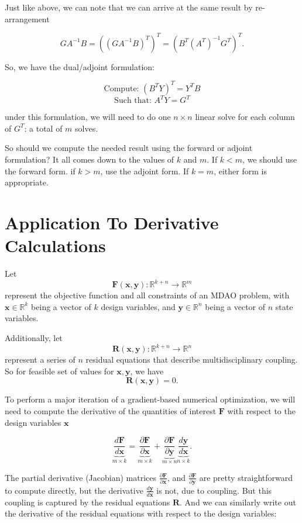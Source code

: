 \documentclass{article}
\begin{document}
Just like above, we can note that we can arrive at the same result by re-arrangement

$$G A^{-1} B = \left(\left( G A^{-1} B\right)^T\right)^T = \left( B^T \left(A^T\right)^{-1} G^T \right)^T.$$

So, we have the dual/adjoint formulation:

$$\text{Compute: } \left(B^T Y\right)^T = Y^T B$$
$$\text{Such that: } A^T Y = G^T$$

under this formulation, we will need to do one $n \times n$ linear solve for each
column of $G^T$: a total of $m$ solves.

So should we compute the needed result using the forward or adjoint formulation?
It all comes down to the values of $k$ and $m$. If $k < m$, we should use the forward form.
if $k > m$, use the adjoint form. If $k = m$, either form is appropriate.

\section{Application To Derivative Calculations}

Let 
$$\mathbf F \left(\mathbf x, \mathbf y \right) : \mathbb{R}^{k + n} \to \mathbb{R}^{m}$$
represent the objective function and all constraints of an MDAO problem,
with $\mathbf x \in \mathbb{R}^{k}$ being a vector of $k$  design variables, and 
$\mathbf y \in \mathbb{R}^{n}$ being a vector of $n$ state variables.

Additionally, let
$$\mathbf R \left(\mathbf x, \mathbf y \right) : \mathbb{R}^{k + n} \to \mathbb{R}^{n}$$
represent a series of $n$ residual equations that describe multidisciplinary coupling.
So for feasible set of values for $\mathbf x, \mathbf y$, we have
$$ \mathbf R \left(\mathbf x, \mathbf y \right)  = 0. $$

To perform a major iteration of a gradient-based numerical optimization, we will need to compute the 
derivative of the quantities of interest $\mathbf F$ with respect to the design variables $\mathbf x$ 

$$ \underbrace {\frac{d \mathbf F}{d \mathbf x}}_{m \times k} = \underbrace {\frac{\partial \mathbf F}{\partial \mathbf x}}_{m \times k} + \underbrace{\frac{\partial \mathbf F}{\partial \mathbf y}}_{m \times n} \underbrace {\frac{d \mathbf y}{d \mathbf x}}_{n \times k}. $$

The partial derivative (Jacobian) matrices $\frac{\partial \mathbf F}{\partial \mathbf x}$, and $\frac{\partial \mathbf F}{\partial \mathbf y}$ are pretty straightforward to compute directly, but the derivative $\frac{d \mathbf y}{d \mathbf x} $ is not, due to coupling. But this coupling is captured by the residual equations $\mathbf R$. And we can similarly write out the derivative of the residual equations with respect to the design variables:
\end{document}

